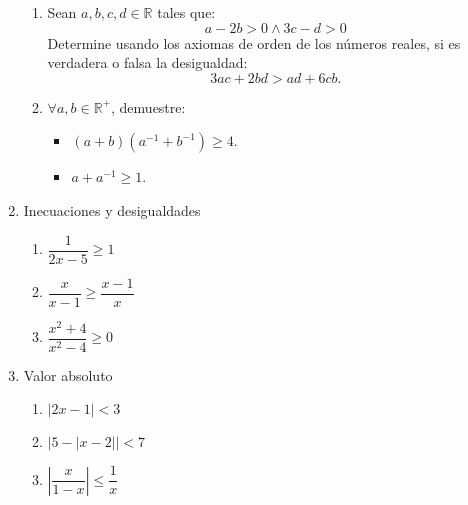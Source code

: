 \documentclass[12pt]{article}
\begin{document}
\begin{enumerate}
\begin{enumerate}
                  \item Sean $a,b,c,d\in\mathbb{R}$ tales que: $$a-2b>0 \wedge 3c-d>0$$ Determine usando los axiomas de orden de los números reales, si es verdadera o falsa la desigualdad: $$3ac+2bd>ad+6cb.$$
                  \item $\forall a,b \in\mathbb{R}^{+}$, demuestre:
                        \begin{itemize}
                              \item $(a+b)(a^{-1}+b^{-1})\geq4$.
                              \item $a+a^{-1}\geq1$.
                        \end{itemize}
            \end{enumerate}
      \item Inecuaciones y desigualdades
            \begin{enumerate}
                  \item $\dfrac{1}{2x-5}\geq1$
                  \item $\dfrac{x}{x-1}\geq \dfrac{x-1}{x}$ %
                  \item $\dfrac{x^{2}+4}{x^{2}-4}\geq0$
            \end{enumerate}
      \item Valor absoluto
            \begin{enumerate}
                  \item $|{2x-1}|<3$
                  \item $|{5-|{x-2}|}|<7$
                  \item $\left|{\dfrac{x}{1-x}}\right|\leq\dfrac{1}{x}$
            \end{enumerate}
\end{enumerate}
\end{document}
